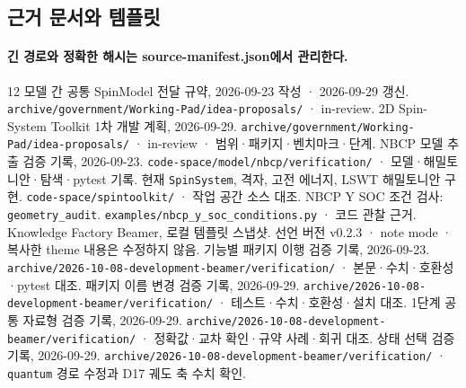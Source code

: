 \subsection{근거 문서와 템플릿}\label{sources}
\begingroup%
  \framesubtitle{긴 경로와 정확한 해시는 source-manifest.json에서 관리한다.}
  \small
  \begin{thebibliography}{12}
      모델 간 공통 SpinModel 전달 규약, 2026-09-23 작성 · 2026-09-29 갱신.
      \newblock \texttt{archive/government/Working-Pad/idea-proposals/} · in-review.
      2D Spin-System Toolkit 1차 개발 계획, 2026-09-29.
      \newblock \texttt{archive/government/Working-Pad/idea-proposals/} · in-review · 범위·패키지·벤치마크·단계.
      NBCP 모델 추출 검증 기록, 2026-09-23.
      \newblock \texttt{code-space/model/nbcp/verification/} · 모델·해밀토니안·탐색·pytest 기록.
      현재 \texttt{SpinSystem}, 격자, 고전 에너지, LSWT 해밀토니안 구현.
      \newblock \texttt{code-space/spintoolkit/} · 작업 공간 소스 대조.
      NBCP Y SOC 조건 검사: \texttt{geometry\_audit}.
      \newblock \texttt{examples/nbcp\_y\_soc\_conditions.py} · 코드 관찰 근거.
      Knowledge Factory Beamer, 로컬 템플릿 스냅샷.
      \newblock 선언 버전 v0.2.3 · note mode · 복사한 theme 내용은 수정하지 않음.
      기능별 패키지 이행 검증 기록, 2026-09-23.
      \newblock \texttt{archive/2026-10-08-development-beamer/verification/} · 본문·수치·호환성·pytest 대조.
      패키지 이름 변경 검증 기록, 2026-09-29.
      \newblock \texttt{archive/2026-10-08-development-beamer/verification/} · 테스트·수치·호환성·설치 대조.
      1단계 공통 자료형 검증 기록, 2026-09-29.
      \newblock \texttt{archive/2026-10-08-development-beamer/verification/} · 정확값·교차 확인·규약 사례·회귀 대조.
      상태 선택 검증 기록, 2026-09-29.
      \newblock \texttt{archive/2026-10-08-development-beamer/verification/} · \texttt{quantum} 경로 수정과 D17 궤도 축 수치 확인.
  \end{thebibliography}
\endgroup


